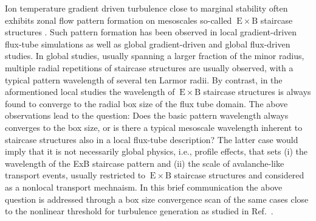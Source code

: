 \documentclass[aip, amsmath, amssymb, reprint, twocolumn]{revtex4-1}
\begin{document}
Ion temperature gradient driven turbulence close to marginal stability often exhibits zonal flow pattern formation on mesoscales \textemdash so-called ${\mathrm{\:E}\times\mathrm{B}}$ staircase structures \cite{pradalier2010}.
Such pattern formation has been observed in local gradient-driven flux-tube simulations \cite{peeters2016, weikl2017, rath2021} as well as global gradient-driven \cite{mcmillan2009, villard2013, seo2022} and global flux-driven \cite{pradalier2010, pradalier2015, wang2020, kim2022, kishimoto2023} studies. 
In global studies, usually spanning a larger fraction of the minor radius, multiple radial repetitions of staircase structures are usually observed, with a typical pattern wavelength of several ten Larmor radii.
By contrast, in the aformentioned local studies the wavelength of ${\mathrm{\:E}\times\mathrm{B}}$ staircase structures is always found to converge to the radial box size of the flux tube domain.
The above observations lead to the question: 
Does the basic pattern wavelength always converges to the box size, or is there a typical mesoscale wavelength inherent to staircase structures also in a local flux-tube description?
The latter case would imply that it is not necessarily global physics, i.e., profile effects, that sets (i) the wavelength of the ExB staircase pattern and (ii) the scale of avalanche-like transport events, usually restricted to ${\mathrm{\:E}\times\mathrm{B}}$ staircase structures and considered as a nonlocal transport mechnaism\cite{pradalier2010}. 
In this brief communication the above question is addressed through a box size convergence scan of the same cases close to the nonlinear threshold for turbulence generation as studied in Ref.~\cite{peeters2016}.\bigskip

\end{document}
